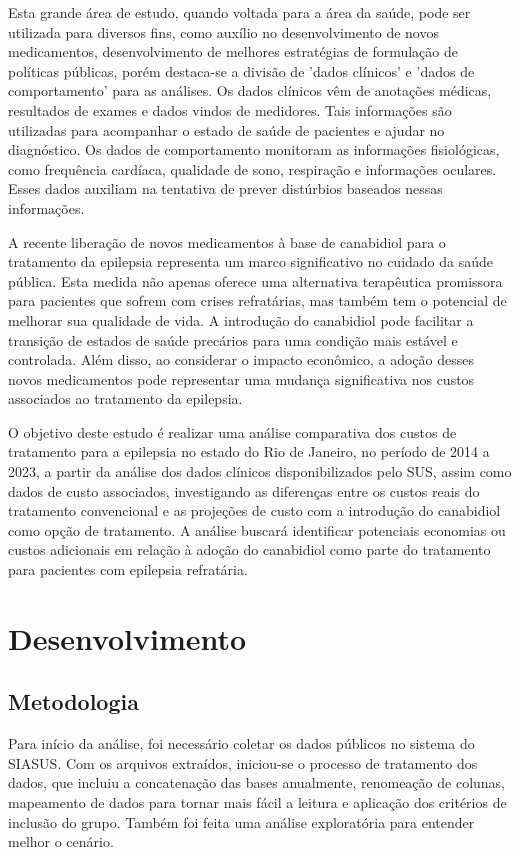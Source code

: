 \documentclass[article,a4paper,12pt,brazil,sumario=tradicional]{abntex2}
\begin{document}
Esta grande área de estudo, quando voltada para a área da saúde, pode ser utilizada para diversos fins, como auxílio no desenvolvimento de novos medicamentos, desenvolvimento de melhores estratégias de formulação de políticas públicas, porém destaca-se a divisão de 'dados clínicos' e 'dados de comportamento' para as análises. Os dados clínicos vêm de anotações médicas, resultados de exames e dados vindos de medidores. Tais informações são utilizadas para acompanhar o estado de saúde de pacientes e ajudar no diagnóstico. Os dados de comportamento monitoram as informações fisiológicas, como frequência cardíaca, qualidade de sono, respiração e informações oculares. Esses dados auxiliam na tentativa de prever distúrbios baseados nessas informações.

A recente liberação de novos medicamentos à base de canabidiol para o tratamento da epilepsia representa um marco significativo no cuidado da saúde pública. Esta medida não apenas oferece uma alternativa terapêutica promissora para pacientes que sofrem com crises refratárias, mas também tem o potencial de melhorar sua qualidade de vida. A introdução do canabidiol pode facilitar a transição de estados de saúde precários para uma condição mais estável e controlada. Além disso, ao considerar o impacto econômico, a adoção desses novos medicamentos pode representar uma mudança significativa nos custos associados ao tratamento da epilepsia.

O objetivo deste estudo é realizar uma análise comparativa dos custos de tratamento para a epilepsia no estado do Rio de Janeiro, no período de 2014 a 2023, a partir da análise dos dados clínicos disponibilizados pelo SUS, assim como dados de custo associados, investigando as diferenças entre os custos reais do tratamento convencional e as projeções de custo com a introdução do canabidiol como opção de tratamento. A análise buscará identificar potenciais economias ou custos adicionais em relação à adoção do canabidiol como parte do tratamento para pacientes com epilepsia refratária.

\section{Desenvolvimento}

\subsection{Metodologia}

Para início da análise, foi necessário coletar os dados públicos no sistema do SIASUS. Com os arquivos extraídos, iniciou-se o processo de tratamento dos dados, que incluiu a concatenação das bases anualmente, renomeação de colunas, mapeamento de dados para tornar mais fácil a leitura e aplicação dos critérios de inclusão do grupo. Também foi feita uma análise exploratória para entender melhor o cenário.
\end{document}
